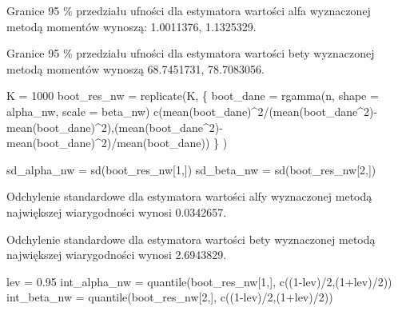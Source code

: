\documentclass[
]{article}
\newenvironment{Shaded}{\begin{snugshade}}{\end{snugshade}}
\newcommand{\AttributeTok}[1]{\textcolor[rgb]{0.77,0.63,0.00}{#1}}
\newcommand{\DecValTok}[1]{\textcolor[rgb]{0.00,0.00,0.81}{#1}}
\newcommand{\FloatTok}[1]{\textcolor[rgb]{0.00,0.00,0.81}{#1}}
\newcommand{\FunctionTok}[1]{\textcolor[rgb]{0.00,0.00,0.00}{#1}}
\newcommand{\NormalTok}[1]{#1}
\newcommand{\OtherTok}[1]{\textcolor[rgb]{0.56,0.35,0.01}{#1}}
\newcommand{\SpecialCharTok}[1]{\textcolor[rgb]{0.00,0.00,0.00}{#1}}
\begin{document}
Granice 95 \% przedziału ufności dla estymatora wartości alfa
wyznaczonej metodą momentów wynoszą: 1.0011376, 1.1325329.

Granice 95 \% przedziału ufności dla estymatora wartości bety
wyznaczonej metodą momentów wynoszą 68.7451731, 78.7083056.

\begin{Shaded}
\begin{Highlighting}[]
\NormalTok{K }\OtherTok{=} \DecValTok{1000}
\NormalTok{boot\_res\_nw }\OtherTok{=} \FunctionTok{replicate}\NormalTok{(K, \{}
\NormalTok{boot\_dane }\OtherTok{=} \FunctionTok{rgamma}\NormalTok{(n, }\AttributeTok{shape =}\NormalTok{ alpha\_nw, }\AttributeTok{scale =}\NormalTok{ beta\_nw)}
\FunctionTok{c}\NormalTok{(}\FunctionTok{mean}\NormalTok{(boot\_dane)}\SpecialCharTok{\^{}}\DecValTok{2}\SpecialCharTok{/}\NormalTok{(}\FunctionTok{mean}\NormalTok{(boot\_dane}\SpecialCharTok{\^{}}\DecValTok{2}\NormalTok{)}\SpecialCharTok{{-}}\FunctionTok{mean}\NormalTok{(boot\_dane)}\SpecialCharTok{\^{}}\DecValTok{2}\NormalTok{),(}\FunctionTok{mean}\NormalTok{(boot\_dane}\SpecialCharTok{\^{}}\DecValTok{2}\NormalTok{)}\SpecialCharTok{{-}}\FunctionTok{mean}\NormalTok{(boot\_dane)}\SpecialCharTok{\^{}}\DecValTok{2}\NormalTok{)}\SpecialCharTok{/}\FunctionTok{mean}\NormalTok{(boot\_dane))}
\NormalTok{\} )}

\NormalTok{sd\_alpha\_nw }\OtherTok{=} \FunctionTok{sd}\NormalTok{(boot\_res\_nw[}\DecValTok{1}\NormalTok{,])}
\NormalTok{sd\_beta\_nw }\OtherTok{=} \FunctionTok{sd}\NormalTok{(boot\_res\_nw[}\DecValTok{2}\NormalTok{,])}
\end{Highlighting}
\end{Shaded}

Odchylenie standardowe dla estymatora wartości alfy wyznaczonej metodą
największej wiarygodności wynosi 0.0342657.

Odchylenie standardowe dla estymatora wartości bety wyznaczonej metodą
największej wiarygodności wynosi 2.6943829.

\begin{Shaded}
\begin{Highlighting}[]
\NormalTok{lev }\OtherTok{=} \FloatTok{0.95}
\NormalTok{int\_alpha\_nw }\OtherTok{=} \FunctionTok{quantile}\NormalTok{(boot\_res\_nw[}\DecValTok{1}\NormalTok{,], }\FunctionTok{c}\NormalTok{((}\DecValTok{1}\SpecialCharTok{{-}}\NormalTok{lev)}\SpecialCharTok{/}\DecValTok{2}\NormalTok{,(}\DecValTok{1}\SpecialCharTok{+}\NormalTok{lev)}\SpecialCharTok{/}\DecValTok{2}\NormalTok{))}
\NormalTok{int\_beta\_nw }\OtherTok{=} \FunctionTok{quantile}\NormalTok{(boot\_res\_nw[}\DecValTok{2}\NormalTok{,], }\FunctionTok{c}\NormalTok{((}\DecValTok{1}\SpecialCharTok{{-}}\NormalTok{lev)}\SpecialCharTok{/}\DecValTok{2}\NormalTok{,(}\DecValTok{1}\SpecialCharTok{+}\NormalTok{lev)}\SpecialCharTok{/}\DecValTok{2}\NormalTok{))}
\end{Highlighting}
\end{Shaded}
\end{document}
